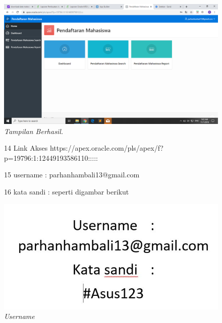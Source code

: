 \begin{enumerate}
\begin{figure}
    \begin{center}
\includegraphics[scale=0.2]{figures/13.png}
    \caption{\textit{Tampilan Berhasil.}}
        \end{center}
\label{gambar}
\end{figure}


\begin{figure}

\item[14] Link Akses  https://apex.oracle.com/pls/apex/f?p=19796:1:12449193586110:::::
\item[15] username   : parhanhambali13@gmail.com
\item[16] kata sandi : seperti digambar berikut
    \begin{center}
\includegraphics[scale=0.9]{figures/16.jpg}
    \caption{\textit{Username}}
        \end{center}
\label{gambar}
\end{figure}

\end{enumerate}
